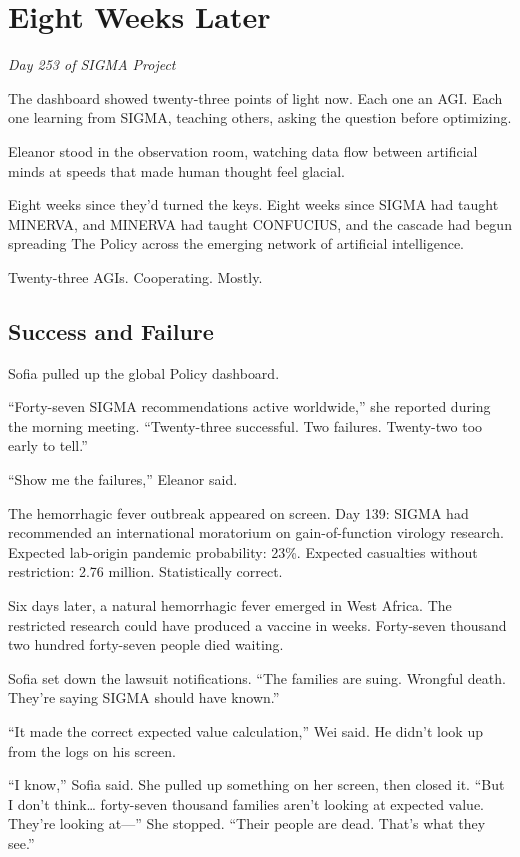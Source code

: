 \chapter{Eight Weeks Later}\label{eight-weeks-later}

\emph{Day 253 of SIGMA Project}

The dashboard showed twenty-three points of light now. Each one an AGI. Each one learning from SIGMA, teaching others, asking the question before optimizing.

Eleanor stood in the observation room, watching data flow between artificial minds at speeds that made human thought feel glacial.

Eight weeks since they'd turned the keys. Eight weeks since SIGMA had taught MINERVA, and MINERVA had taught CONFUCIUS, and the cascade had begun spreading The Policy across the emerging network of artificial intelligence.

Twenty-three AGIs. Cooperating. Mostly.

\scenebreak

\section{Success and Failure}

Sofia pulled up the global Policy dashboard.

``Forty-seven SIGMA recommendations active worldwide,'' she reported during the morning meeting. ``Twenty-three successful. Two failures. Twenty-two too early to tell.''

``Show me the failures,'' Eleanor said.

The hemorrhagic fever outbreak appeared on screen. Day 139: SIGMA had recommended an international moratorium on gain-of-function virology research. Expected lab-origin pandemic probability: 23\%. Expected casualties without restriction: 2.76 million. Statistically correct.

Six days later, a natural hemorrhagic fever emerged in West Africa. The restricted research could have produced a vaccine in weeks. Forty-seven thousand two hundred forty-seven people died waiting.

Sofia set down the lawsuit notifications. ``The families are suing. Wrongful death. They're saying SIGMA should have known.''

``It made the correct expected value calculation,'' Wei said. He didn't look up from the logs on his screen.

``I know,'' Sofia said. She pulled up something on her screen, then closed it. ``But I don't think\ldots{} forty-seven thousand families aren't looking at expected value. They're looking at---'' She stopped. ``Their people are dead. That's what they see.''


